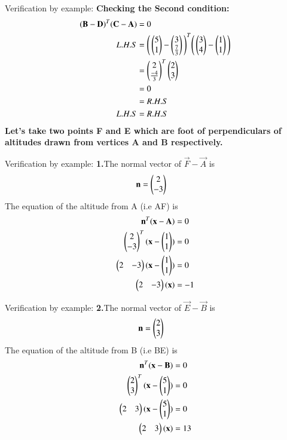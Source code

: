 \documentclass{beamer}
\begin{document}
\begin{frame}{Verification by example:}
\textbf{Checking the Second condition:}
\begin{align}
(\mathbf{B}- \mathbf{D} )^{T} (\mathbf{C}- \mathbf{A})
&=0\\
L.H.S&=\Bigg(\begin{pmatrix}5\\1\end{pmatrix}- \begin{pmatrix}3\\\tfrac{7}{3}\end{pmatrix}\Bigg )^{T} \Bigg(\begin{pmatrix}3\\4\end{pmatrix}- \begin{pmatrix}1\\1\end{pmatrix}\Bigg)\\\nonumber
&=\begin{pmatrix}2\\\tfrac{-4}{3}\end{pmatrix} ^{T} \begin{pmatrix}2\\3\end{pmatrix}\\\nonumber
&=0\\\nonumber
&=R.H.S\\
L.H.S&=R.H.S
\end{align}
\textbf{Let's take two points F and E which are foot of perpendiculars of altitudes drawn from vertices A and B respectively.}
\end{frame}
\begin{frame}{Verification by example:}
\textbf{1.}The normal vector of    $\vec{F}-\vec{A}$ is\\ 
\begin{align}
\mathbf{n}&=\begin{pmatrix}2\\-3\end{pmatrix}
\end{align}
The equation of the altitude from A (i.e AF) is
\begin{align}
\mathbf{n}^{T}(\mathbf{x-A})&=0\\
\begin{pmatrix}2\\-3\end{pmatrix}^{T}(\mathbf{x}-\begin{pmatrix}1\\1\end{pmatrix})&=0\\
\begin{pmatrix}2&-3\end{pmatrix}(\mathbf{x}-\begin{pmatrix}1\\1\end{pmatrix})&=0\\
\begin{pmatrix}2&-3\end{pmatrix}(\mathbf{x})&=-1\\
\end{align}
\end{frame}
\begin{frame}{Verification by example:}
\textbf{2.}The normal vector of    $\vec{E}-\vec{B}$ is\\ 
\begin{align}
\mathbf{n}&=\begin{pmatrix}2\\3\end{pmatrix}
\end{align}
The equation of the altitude from B (i.e BE) is
\begin{align}
\mathbf{n}^{T}(\mathbf{x-B})&=0\\
\begin{pmatrix}2\\3\end{pmatrix}^{T}(\mathbf{x}-\begin{pmatrix}5\\1\end{pmatrix})&=0\\
\begin{pmatrix}2&3\end{pmatrix}(\mathbf{x}-\begin{pmatrix}5\\1\end{pmatrix})&=0\\
\begin{pmatrix}2&3\end{pmatrix}(\mathbf{x})&=13\\
\end{align}
\end{frame}
\end{document}
